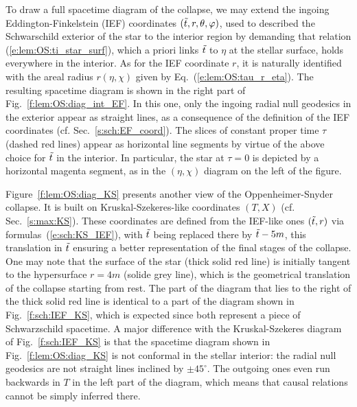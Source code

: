 To draw a full spacetime diagram of the collapse, we may extend the ingoing
Eddington-Finkelstein (IEF) coordinates $({\tilde t},r,\theta,\varphi)$, used to described the
Schwarschild exterior of the star to the interior region by demanding
that relation (\ref{e:lem:OS:ti_star_surf}), which a priori links ${\tilde t}$
to $\eta$ at the stellar surface, holds everywhere in the interior.
As for the IEF coordinate $r$, it is naturally identified with the areal
radius $r(\eta,\chi)$ given by Eq.~(\ref{e:lem:OS:tau_r_eta}).
The resulting spacetime diagram is shown in the right part of Fig.~\ref{f:lem:OS:diag_int_EF}.
In this one, only the ingoing radial null geodesics in the exterior appear
as straight lines, as a consequence of the definition of the IEF coordinates
(cf. Sec.~\ref{s:sch:EF_coord}). The slices of constant proper time $\tau$
(dashed red lines) appear as horizontal line segments by virtue of the above
choice for ${\tilde t}$ in the interior. In particular, the star at $\tau = 0$
is depicted by a horizontal magenta segment, as in the $(\eta,\chi)$ diagram
on the left of the figure.

Figure~\ref{f:lem:OS:diag_KS} presents another view of the Oppenheimer-Snyder collapse.
It is built on Kruskal-Szekeres-like coordinates
$(T,X)$ (cf. Sec.~\ref{s:max:KS}). These coordinates are defined from the IEF-like ones $({\tilde t}, r)$ via formulas~(\ref{e:sch:KS_IEF}), with ${\tilde t}$ being replaced there by ${\tilde t} - 5 m$, this
translation in ${\tilde t}$ ensuring a better representation of the final
stages of the collapse. One may note that the surface of the star (thick solid red line) is initially
tangent to the hypersurface $r=4 m$ (solide grey line), which is the geometrical translation
of the collapse starting from rest. The part of the diagram that lies to the right of the
thick solid red line is identical to a part of the diagram shown in Fig.~\ref{f:sch:IEF_KS}, which
is expected since both represent a piece of Schwarzschild spacetime. A major difference with
the Kruskal-Szekeres diagram of Fig.~\ref{f:sch:IEF_KS} is that the spacetime diagram shown
in Fig.~\ref{f:lem:OS:diag_KS} is not conformal in the stellar interior: the radial null geodesics
are not straight lines inclined by $\pm 45^\circ$. The outgoing ones even run backwards in $T$
in the left part of the diagram, which means that causal relations cannot be simply inferred there.

